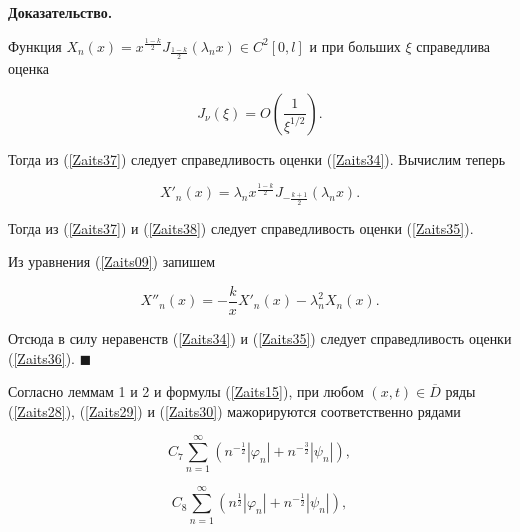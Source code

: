 \textbf{Доказательство.}



Функция $\displaystyle X_n(x)=x^{\frac{1-k}{2}}J_{\frac{1-k}{2}}\left(\lambda_nx\right)\in C^2[0,l]$ и при больших $\xi$ справедлива оценка

\begin{equation}

\label{Zaits37}

J_\nu(\xi)=O\left(\frac{1}{\xi^{1/2}}\right).

\end{equation}

Тогда из (\ref{Zaits37}) следует справедливость оценки (\ref{Zaits34}). Вычислим теперь

\begin{equation}

\label{Zaits38}

X'_n(x)=\lambda_nx^{\frac{1-k}{2}}J_{-\frac{k+1}{2}}\left(\lambda_nx\right).

\end{equation}

Тогда из (\ref{Zaits37}) и (\ref{Zaits38}) следует справедливость оценки (\ref{Zaits35}).



Из уравнения (\ref{Zaits09}) запишем

$$X''_n(x)=-\frac{k}{x}X'_n(x)-\lambda^2_nX_n(x).$$

Отсюда в силу неравенств (\ref{Zaits34}) и (\ref{Zaits35}) следует справедливость оценки (\ref{Zaits36}). $\blacksquare$



Согласно леммам 1 и 2 и формулы (\ref{Zaits15}), при любом $(x,t)\in\overline{D}$ ряды (\ref{Zaits28}), (\ref{Zaits29}) и (\ref{Zaits30}) мажорируются соответственно рядами

\begin{equation}

\label{Zaits39}

C_7\sum\limits_{n=1}^\infty \left(n^{-\frac12}|\varphi_n|+n^{-\frac32}|\psi_n|\right),

\end{equation}

\begin{equation}

\label{Zaits40}

C_8\sum\limits_{n=1}^\infty \left(n^{\frac12}|\varphi_n|+n^{-\frac12}|\psi_n|\right),

\end{equation}


